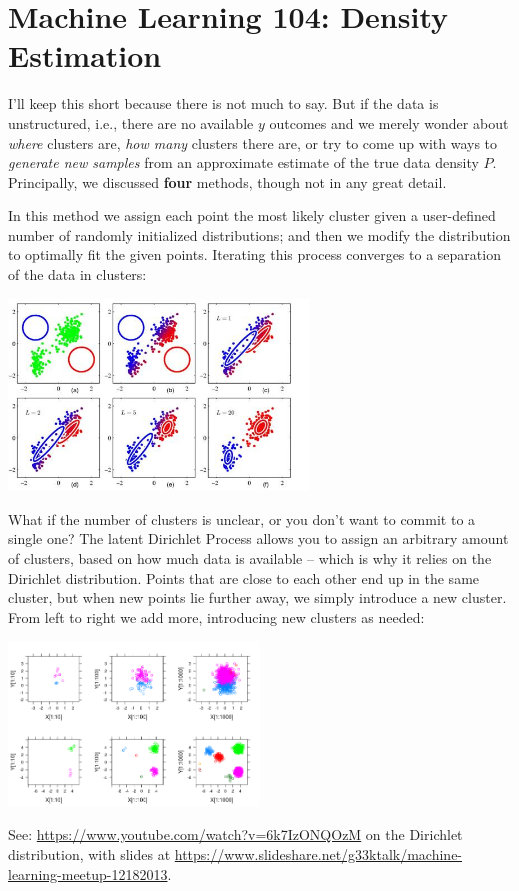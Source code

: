 \documentclass{article}
\begin{document}

\section{Machine Learning 104: Density Estimation}
I'll keep this short because there is not much to say. But if the data is unstructured, i.e., there are no available $y$ outcomes and we merely wonder about \textit{where} clusters are, \textit{how many} clusters there are, or try to come up with ways to \textit{generate new samples} from an approximate estimate of the true data density $P$. Principally, we discussed \textbf{four} methods, though not in any great detail.
\begin{spexample}
    In this method we assign each point the most likely cluster given a user-defined number of randomly initialized distributions; and then we modify the distribution to optimally fit the given points. Iterating this process converges to a separation of the data in clusters:
    \begin{center}\includegraphics[width=0.6\textwidth]{expectation-maximization.jpg}\end{center}
\end{spexample}
\begin{spexample}
    What if the number of clusters is unclear, or you don't want to commit to a single one? The latent Dirichlet Process allows you to assign an arbitrary amount of clusters, based on how much data is available -- which is why it relies on the Dirichlet distribution. Points that are close to each other end up in the same cluster, but when new points lie further away, we simply introduce a new cluster. From left to right we add more, introducing new clusters as needed:
    \begin{center}\includegraphics[width=0.5\textwidth,trim={0cm 0cm 0cm 7cm},clip]{DP_clustering_simulation.png}\end{center}
    See: \url{https://www.youtube.com/watch?v=6k7IzONQOzM} on the Dirichlet distribution, with slides at \url{https://www.slideshare.net/g33ktalk/machine-learning-meetup-12182013}.
\end{spexample}
\end{document}
